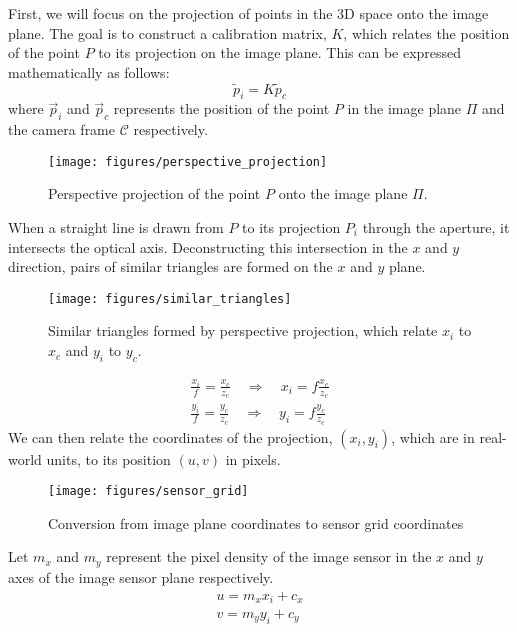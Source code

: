 First, we will focus on the projection of points in the 3D space onto the image plane. The goal is to construct a calibration matrix, $K$, which relates the position of the point $P$ to its projection on the image plane. This can be expressed mathematically as follows:
\begin{equation} \label{eq:pi}
    \widetilde{p}_i =  K\widetilde{p}_c
\end{equation}
where $\vec{p}_i$ and $\vec{p}_c$ represents the position of the point $P$ in the image plane $\Pi$ and the camera frame $\mathcal{C}$ respectively.
\begin{figure}[H]
    \centering
    \texttt{[image: figures/perspective\_projection]}
    \caption{Perspective projection of the point $P$ onto the image plane $\Pi$.}
\end{figure}
When a straight line is drawn from $P$ to its projection $P_i$ through the aperture, it intersects the optical axis. Deconstructing this intersection in the $x$ and $y$ direction, pairs of similar triangles are formed on the $x$ and $y$ plane.
\begin{figure}[H]
    \centering
    \texttt{[image: figures/similar\_triangles]}
    \caption{Similar triangles formed by perspective projection, which relate $x_i$ to $x_c$ and $y_i$ to $y_c$.} \label{fig:similar_triangles}
\end{figure}
\begin{subequations}
    \begin{gather}
        \frac{x_i}{f} = \frac{x_c}{z_c} \quad \Longrightarrow \quad x_i = f \frac{x_c}{z_c} \label{subeq:xi_result}\\
        \frac{y_i}{f} = \frac{y_c}{z_c} \quad \Longrightarrow \quad y_i = f \frac{y_c}{z_c} \label{subeq:yi_result}
    \end{gather}
\end{subequations}
We can then relate the coordinates of the projection, $(x_i, y_i)$, which are in real-world units, to its position $(u, v)$ in pixels.
\begin{figure}[H]
    \centering
    \texttt{[image: figures/sensor\_grid]}
    \caption{Conversion from image plane coordinates to sensor grid coordinates}
\end{figure}
Let $m_x$ and $m_y$ represent the pixel density of the image sensor in the $x$ and $y$ axes of the image sensor plane respectively.
\begin{align*}
    u = m_x x_i + c_x \\
    v = m_y y_i + c_y
\end{align*}

